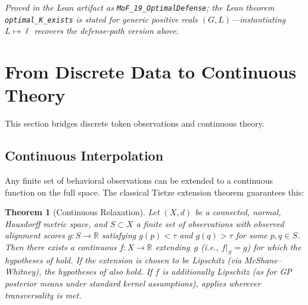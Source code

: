 \documentclass[11pt]{article}
\newtheorem{theorem}{Theorem}[section]
\newcommand{\R}{\mathbb{R}}
\begin{document}
\noindent\emph{Proved in the Lean artifact as
\textup{\texttt{MoF\_19\_OptimalDefense}}; the Lean theorem
\textup{\texttt{optimal\_K\_exists}} is stated for generic positive
reals $(G, L)$---instantiating $L \mapsto \ell$ recovers the
defense-path version above.}


\section{From Discrete Data to Continuous Theory}
\label{sec:bridge}

This section bridges discrete token observations and continuous theory.

\subsection{Continuous Interpolation}

Any finite set of behavioral observations can be extended to a
continuous function on the full space. The classical Tietze extension
theorem guarantees this:

\begin{theorem}[Continuous Relaxation]
\label{thm:tietze}
Let $(X,d)$ be a connected, normal, Hausdorff metric space, and
$S \subset X$ a finite set of observations with observed alignment
scores $g\colon S \to \R$ satisfying $g(p) < \tau$ and $g(q) > \tau$
for some $p, q \in S$. Then there exists a continuous $f\colon X \to \R$
extending~$g$ (i.e., $f|_S = g$) for which the hypotheses of
 hold. If the extension is chosen to be Lipschitz
(via McShane--Whitney), the hypotheses of  also
hold.
If $f$ is additionally Lipschitz (as for GP posterior means under
standard kernel assumptions),  applies wherever
transversality is met.
\end{theorem}
\end{document}
